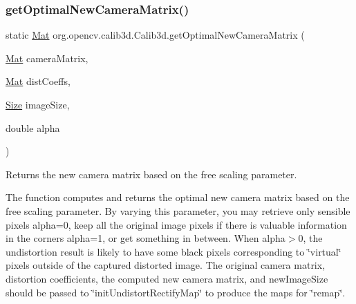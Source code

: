 \subsubsection{\texorpdfstring{get\+Optimal\+New\+Camera\+Matrix()}{getOptimalNewCameraMatrix()}\hspace{0.1cm}{\footnotesize\ttfamily [2/2]}}
{\footnotesize\ttfamily static \mbox{\hyperlink{classorg_1_1opencv_1_1core_1_1_mat}{Mat}} org.\+opencv.\+calib3d.\+Calib3d.\+get\+Optimal\+New\+Camera\+Matrix (\begin{DoxyParamCaption}\item[{\mbox{\hyperlink{classorg_1_1opencv_1_1core_1_1_mat}{Mat}}}]{camera\+Matrix,  }\item[{\mbox{\hyperlink{classorg_1_1opencv_1_1core_1_1_mat}{Mat}}}]{dist\+Coeffs,  }\item[{\mbox{\hyperlink{classorg_1_1opencv_1_1core_1_1_size}{Size}}}]{image\+Size,  }\item[{double}]{alpha }\end{DoxyParamCaption})\hspace{0.3cm}{\ttfamily [static]}}

Returns the new camera matrix based on the free scaling parameter.

The function computes and returns the optimal new camera matrix based on the free scaling parameter. By varying this parameter, you may retrieve only sensible pixels {\ttfamily alpha=0}, keep all the original image pixels if there is valuable information in the corners {\ttfamily alpha=1}, or get something in between. When {\ttfamily alpha$>$0}, the undistortion result is likely to have some black pixels corresponding to \char`\"{}virtual\char`\"{} pixels outside of the captured distorted image. The original camera matrix, distortion coefficients, the computed new camera matrix, and {\ttfamily new\+Image\+Size} should be passed to \char`\"{}init\+Undistort\+Rectify\+Map\char`\"{} to produce the maps for \char`\"{}remap\char`\"{}.


